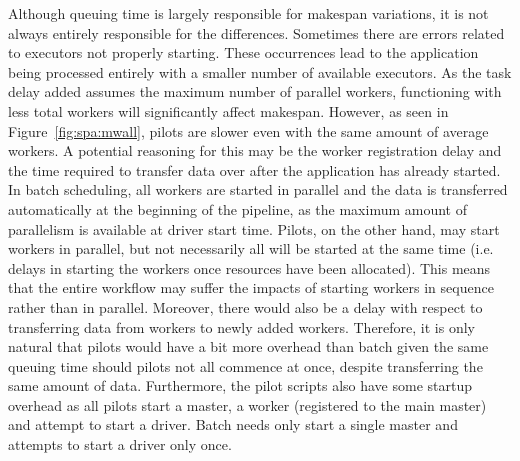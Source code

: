     Although queuing time is largely responsible for makespan variations, it is
    not always entirely responsible for the differences. Sometimes there are
    errors related to executors not properly starting. These occurrences lead to
    the application being processed entirely with a smaller number of available
    executors. As the task delay added assumes the maximum number of parallel
    workers, functioning with less total workers will significantly affect
    makespan. However, as seen in Figure~\ref{fig:spa:mwall}, pilots are slower
    even with the same amount of average workers. A potential reasoning for this
    may be the worker registration delay and the time required to transfer data
    over after the application has already started. In batch scheduling, all
    workers are started in parallel and the data is transferred automatically at
    the beginning of the pipeline, as the maximum amount of parallelism is
    available at driver start time. Pilots, on the other hand, may start workers
    in parallel, but not necessarily all will be started at the same time (i.e.
    delays in starting the workers once resources have been allocated). This
    means that the entire workflow may suffer the impacts of starting workers in
    sequence rather than in parallel. Moreover, there would also be a delay with
    respect to transferring data from workers to newly added workers. Therefore,
    it is only natural that pilots would have a bit more overhead than batch
    given the same queuing time should pilots not all commence at once, despite
    transferring the same amount of data. Furthermore, the pilot scripts also
    have some startup overhead as all pilots start a master, a worker
    (registered to the main master) and attempt to start a driver. Batch needs
    only start a single master and attempts to start a driver only once.
    
